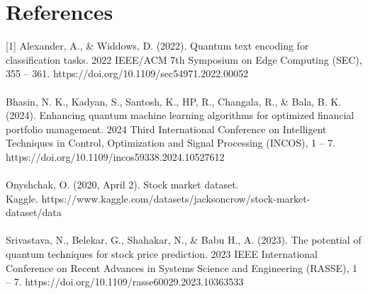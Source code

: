 \documentclass{article}
\begin{document}
\section*{References}
[1] Alexander, A., \& Widdows, D. (2022). Quantum text encoding for classification tasks. 2022 IEEE/ACM 7th Symposium on Edge Computing (SEC), 355 – 361. https://doi.org/10.1109/sec54971.2022.00052 
\\
\\
\noindent
[2] Bhasin, N. K., Kadyan, S., Santosh, K., HP, R., Changala, R., \& Bala, B. K. (2024). Enhancing quantum machine learning algorithms for optimized financial portfolio management. 2024 Third International Conference on Intelligent Techniques in Control, Optimization and Signal Processing (INCOS), 1 – 7. https://doi.org/10.1109/incos59338.2024.10527612 
\\
\\
\noindent
[3] Onyshchak, O. (2020, April 2). Stock market dataset. \\
Kaggle. https://www.kaggle.com/datasets/jacksoncrow/stock-market-dataset/data 
\\
\\
\noindent
[4] Srivastava, N., Belekar, G., Shahakar, N., \& Babu H., A. (2023). The potential of quantum techniques for stock price prediction. 2023 IEEE International Conference on Recent Advances in Systems Science and Engineering (RASSE), 1 – 7. https://doi.org/10.1109/rasse60029.2023.10363533 
\end{document}
